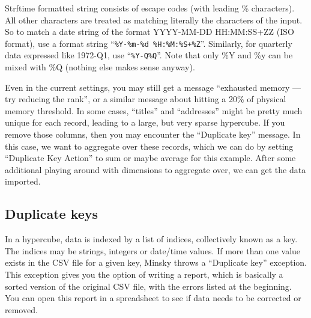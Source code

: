 Strftime formatted string consists of escape codes (with leading \%
characters). All other characters are treated as matching literally
the characters of the input. So to match a date string of the format
YYYY-MM-DD HH:MM:SS+ZZ (ISO format), use a format string
``\verb|%Y-%m-%d %H:%M:%S+%Z|''. Similarly, for quarterly data
expressed like 1972-Q1, use ``\verb+%Y-Q%Q+''. Note that only \%Y and
\%y can be mixed with \%Q (nothing else makes sense anyway).

Even in the current settings, you may still get a message ``exhausted
memory --- try reducing the rank'', or a similar message about hitting
a 20\% of physical memory threshold. In some cases, ``titles'' and
``addresses'' might be pretty much unique for each record, leading to
a large, but very sparse hypercube. If you remove those columns, then
you may encounter the ``Duplicate key'' message. In this case, we want
to aggregate over these records, which we can do by setting
``Duplicate Key Action'' to sum or maybe average for this
example. After some additional playing around with dimensions to
aggregate over, we can get the data imported.

\begin{center}
\end{center}

\subsection{Duplicate keys}

In a hypercube, data is indexed by a list of indices, collectively
known as a key. The indices may be strings, integers or date/time
values. If more than one value exists in the CSV file for a given key,
Minsky throws a ``Duplicate key'' exception. This exception gives you
the option of writing a report, which is basically a sorted version of
the original CSV file, with the errors listed at the beginning. You
can open this report in a spreadsheet to see if data needs to be
corrected or removed.

